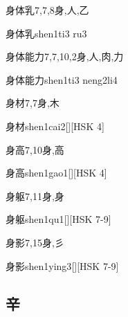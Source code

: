 \begin{Entry}{身体乳}{7,7,8}{⾝,⼈,⼄}
  \begin{Phonetics}{身体乳}{shen1ti3 ru3}
  \end{Phonetics}
\end{Entry}

\begin{Entry}{身体能力}{7,7,10,2}{⾝,⼈,⾁,⼒}
  \begin{Phonetics}{身体能力}{shen1ti3 neng2li4}
  \end{Phonetics}
\end{Entry}

\begin{Entry}{身材}{7,7}{⾝,⽊}
  \begin{Phonetics}{身材}{shen1cai2}[][HSK 4]
  \end{Phonetics}
\end{Entry}

\begin{Entry}{身高}{7,10}{⾝,⾼}
  \begin{Phonetics}{身高}{shen1gao1}[][HSK 4]
  \end{Phonetics}
\end{Entry}

\begin{Entry}{身躯}{7,11}{⾝,⾝}
  \begin{Phonetics}{身躯}{shen1qu1}[][HSK 7-9]
  \end{Phonetics}
\end{Entry}

\begin{Entry}{身影}{7,15}{⾝,⼺}
  \begin{Phonetics}{身影}{shen1ying3}[][HSK 7-9]
  \end{Phonetics}
\end{Entry}

\subsection*{辛}

